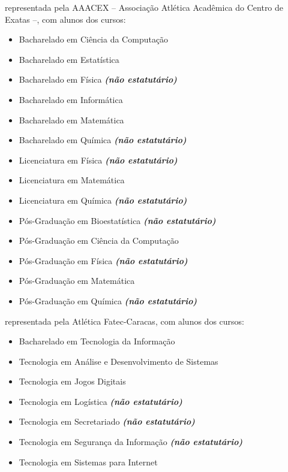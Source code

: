\begin{article}
\begin{description}[noitemsep]
		\item[UEM] representada pela AAACEX -- Associação Atlética Acadêmica do Centro de Exatas --, com alunos dos cursos:
		\begin{itemize}[noitemsep]
			\item Bacharelado em Ciência da Computação
			\item Bacharelado em Estatística
			\item Bacharelado em Física \textbf{\textit{(não estatutário)}}
			\item Bacharelado em Informática
			\item Bacharelado em Matemática
			\item Bacharelado em Química \textbf{\textit{(não estatutário)}}
			\item Licenciatura em Física \textbf{\textit{(não estatutário)}}
			\item Licenciatura em Matemática
			\item Licenciatura em Química \textbf{\textit{(não estatutário)}}
			\item Pós-Graduação em Bioestatística \textbf{\textit{(não estatutário)}}
			\item Pós-Graduação em Ciência da Computação
			\item Pós-Graduação em Física \textbf{\textit{(não estatutário)}}
			\item Pós-Graduação em Matemática
			\item Pós-Graduação em Química \textbf{\textit{(não estatutário)}}
		\end{itemize}

		\item[Faculdade de Tecnologia - Carapicuíba] representada pela Atlética Fatec-Caracas, com alunos dos cursos:
		\begin{itemize}[noitemsep]
			\item Bacharelado em Tecnologia da Informação
			\item Tecnologia em Análise e Desenvolvimento de Sistemas
			\item Tecnologia em Jogos Digitais
			\item Tecnologia em Logística \textbf{\textit{(não estatutário)}}
			\item Tecnologia em Secretariado \textbf{\textit{(não estatutário)}}
			\item Tecnologia em Segurança da Informação \textbf{\textit{(não estatutário)}}
			\item Tecnologia em Sistemas para Internet
		\end{itemize}


\end{description}
\end{article}
